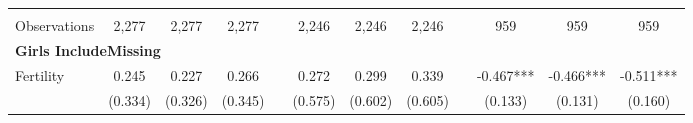 \begin{landscape}
\begin{table}[htpb!]
\begin{center}
\begin{tabular}{lcccp{2mm}cccp{2mm}ccc}
\begin{footnotesize}\end{footnotesize}&\begin{footnotesize}\end{footnotesize}&\begin{footnotesize}\end{footnotesize}&\begin{footnotesize}\end{footnotesize}&\begin{footnotesize}\end{footnotesize}&\begin{footnotesize}\end{footnotesize}&\begin{footnotesize}\end{footnotesize}&\begin{footnotesize}\end{footnotesize}&\begin{footnotesize}\end{footnotesize}&\begin{footnotesize}\end{footnotesize}&\begin{footnotesize}\end{footnotesize}&\begin{footnotesize}\end{footnotesize}\\Observations&2,277&2,277&2,277&&2,246&2,246&2,246&&959&959&959\\
\multicolumn{12}{l}{\textbf{Girls IncludeMissing}}\\ 
Fertility&0.245&0.227&0.266&&0.272&0.299&0.339&&-0.467***&-0.466***&-0.511***\\
&(0.334)&(0.326)&(0.345)&&(0.575)&(0.602)&(0.605)&&(0.133)&(0.131)&(0.160)\\

\end{tabular}
\end{center}
\end{table}
\end{landscape}
